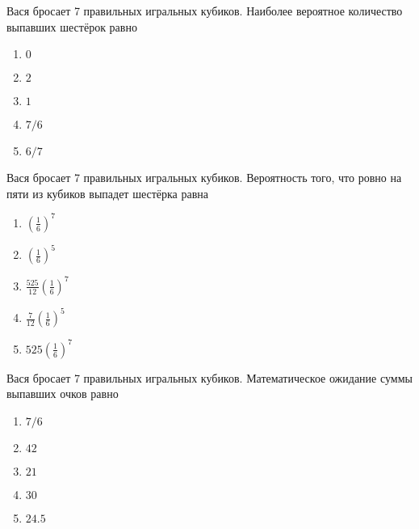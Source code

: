 \documentclass[t]{beamer}
\begin{document}
 \begin{frame} \label{7} 
\begin{block}{7} 

Вася бросает 7 правильных игральных кубиков. Наиболее вероятное количество выпавших шестёрок равно
     


 \end{block} 
\begin{enumerate} 
\item[] \hyperlink{7-No}{\beamergotobutton{} $0$}
\item[] \hyperlink{7-No}{\beamergotobutton{} $2$
}
\item[] \hyperlink{7-Yes}{\beamergotobutton{} $1$}
\item[] \hyperlink{7-No}{\beamergotobutton{} $7/6$}
\item[] \hyperlink{7-No}{\beamergotobutton{} $6/7$}
\end{enumerate} 
\end{frame} 


 \begin{frame} \label{8} 
\begin{block}{8} 

Вася бросает 7 правильных игральных кубиков. Вероятность того, что ровно на пяти из кубиков выпадет шестёрка равна
     


 \end{block} 
\begin{enumerate} 
\item[] \hyperlink{8-No}{\beamergotobutton{} $\left(\frac{1}{6}\right)^7$}
\item[] \hyperlink{8-No}{\beamergotobutton{} $\left(\frac{1}{6}\right)^5$}
\item[] \hyperlink{8-No}{\beamergotobutton{} $\frac{525}{12}\left(\frac{1}{6}\right)^7$}
\item[] \hyperlink{8-No}{\beamergotobutton{} $\frac{7}{12}\left(\frac{1}{6}\right)^5$}
\item[] \hyperlink{8-Yes}{\beamergotobutton{} $525\left(\frac{1}{6}\right)^7$}
\end{enumerate} 
\end{frame} 


 \begin{frame} \label{9} 
\begin{block}{9} 

Вася бросает 7 правильных игральных кубиков. Математическое ожидание суммы выпавших очков равно
     


 \end{block} 
\begin{enumerate} 
\item[] \hyperlink{9-No}{\beamergotobutton{} $7/6$}
\item[] \hyperlink{9-No}{\beamergotobutton{} $42$
}
\item[] \hyperlink{9-No}{\beamergotobutton{} $21$}
\item[] \hyperlink{9-No}{\beamergotobutton{} $30$}
\item[] \hyperlink{9-Yes}{\beamergotobutton{} $24.5$}
\end{enumerate} 
\end{frame} 
\end{document}
